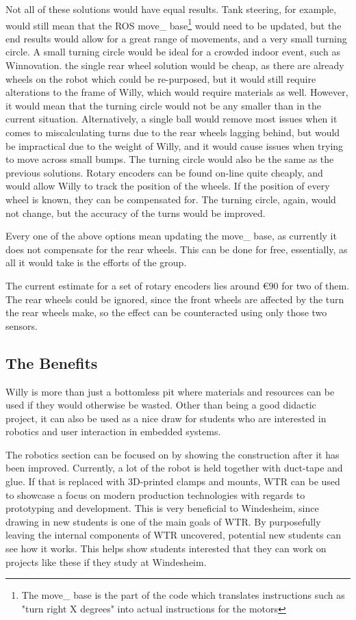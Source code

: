 Not all of these solutions would have equal results.
Tank steering, for example, would still mean that the ROS move\_ base\footnote{The move\_ base is the part of the code which translates instructions such as "turn right X degrees" into actual instructions for the motors} would need to be updated, but the end results would allow for a great range of movements, and a very small turning circle.
A small turning circle would be ideal for a crowded indoor event, such as Winnovation.
the single rear wheel solution would be cheap, as there are already wheels on the robot which could be re-purposed, but it would still require alterations to the frame of Willy, which would require materials as well.
However, it would mean that the turning circle would not be any smaller than in the current situation.
Alternatively, a single ball would remove most issues when it comes to miscalculating turns due to the rear wheels lagging behind, but would be impractical due to the weight of Willy, and it would cause issues when trying to move across small bumps.
The turning circle would also be the same as the previous solutions.
Rotary encoders can be found on-line quite cheaply, and would allow Willy to track the position of the wheels.
If the position of every wheel is known, they can be compensated for.
The turning circle, again, would not change, but the accuracy of the turns would be improved.

Every one of the above options mean updating the move\_ base, as currently it does not compensate for the rear wheels.
This can be done for free, essentially, as all it would take is the efforts of the group.

The current estimate for a set of rotary encoders lies around \euro 90 for two of them.
The rear wheels could be ignored, since the front wheels are affected by the turn the rear wheels make, so the effect can be counteracted using only those two sensors.
\clearpage

\subsection{The Benefits}
Willy is more than just a bottomless pit where materials and resources can be used if they would otherwise be wasted.
Other than being a good didactic project, it can also be used as a nice draw for students who are interested in robotics and user interaction in embedded systems.

The robotics section can be focused on by showing the construction after it has been improved.
Currently, a lot of the robot is held together with duct-tape and glue.
If that is replaced with 3D-printed clamps and mounts, WTR can be used to showcase a focus on modern production technologies with regards to prototyping and development.
This is very beneficial to Windesheim, since drawing in new students is one of the main goals of WTR.
By purposefully leaving the internal components of WTR uncovered, potential new students can see how it works.
This helps show students interested that they can work on projects like these if they study at Windesheim.

